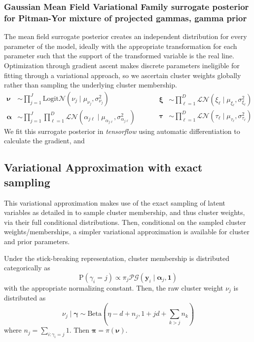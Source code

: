 \subsubsection{Gaussian Mean Field Variational Family surrogate posterior for Pitman-Yor mixture of projected gammas, gamma prior}
The mean field surrogate posterior creates an independent distribution for every parameter of the model, ideally with the appropriate transformation
for each parameter such that the support of the transformed variable is the real line.   Optimization through gradient ascent makes discrete parameters ineligible
for fitting through a variational approach, so we ascertain cluster weights globally rather than sampling the underlying cluster membership.
\begin{equation}
    \begin{aligned}
    \bm{\nu} &\sim {\textstyle\prod}_{j = 1}^J\text{Logit}\mathcal{N}(\nu_j\mid\mu_{\nu_j},\sigma^2_{\nu_j})\\
    \bm{\alpha} &\sim {\textstyle\prod}_{j = 1}^J{\textstyle\prod}_{\ell = 1}^D\mathcal{LN}(\alpha_{j\ell}\mid\mu_{\alpha_{j\ell}},\sigma^2_{\alpha_{j\ell}})
    \end{aligned}
    ~\hspace{1cm}
    \begin{aligned}
    \bm{\xi} &\sim{\textstyle\prod}_{\ell = 1}^D\mathcal{LN}(\xi_{\ell}\mid\mu_{\xi_{\ell}},\sigma^2_{\xi_{\ell}})\\
    \bm{\tau} &\sim{\textstyle\prod}_{\ell = 1}^D\mathcal{LN}(\tau_{\ell}\mid\mu_{\tau_{\ell}}, \sigma^2_{\tau_{\ell}})
    \end{aligned}
\end{equation}
We fit this surrogate posterior in \emph{tensorflow} using automatic differentiation to calculate the gradient, and 

\subsection{Variational Approximation with exact sampling}
This variational approximation makes use of the exact sampling of latent variables as detailed in \cite{Loaizamaya2022} to
sample cluster membership, and thus cluster weights, via their full conditional distributions.  Then, conditional on
the sampled cluster weights/memberships, a simpler variational approximation is available for cluster and prior parameters.

Under the stick-breaking representation, cluster membership is distributed categorically as
\begin{equation}
    \text{P}(\gamma_i = j) \propto \pi_j\mathcal{PG}(\bm{y}_i\mid\bm{\alpha}_j,\bm{1})
\end{equation}
with the appropriate normalizing constant.  Then, the raw cluster weight $\nu_j$ is distributed as
\begin{equation}
    \nu_j\mid\bm{\gamma} \sim \text{Beta}(\eta - d + n_j,1 + jd + \sum_{k > j}n_k)
\end{equation}
where $n_j = \sum_{i:\gamma_i = j}1$.  Then $\bm{\pi} = \pi(\bm{\nu})$.

